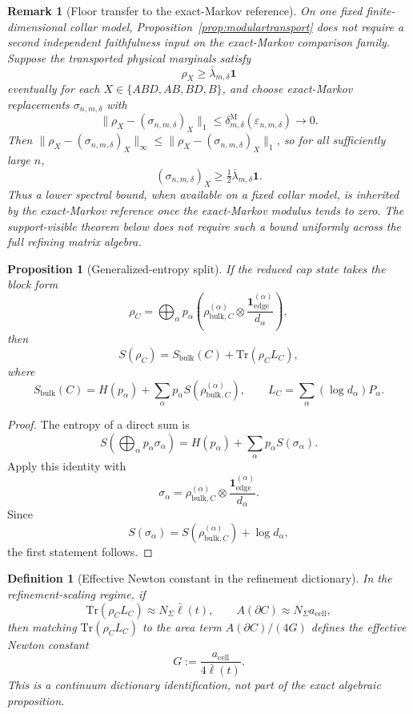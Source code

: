 \documentclass[11pt]{article}
\newtheorem{proposition}[theorem]{Proposition}
\newtheorem{definition}[theorem]{Definition}
\newtheorem{remark}[theorem]{Remark}
\begin{document}
\begin{remark}[Floor transfer to the exact-Markov reference]
On one fixed finite-dimensional collar model, Proposition~\ref{prop:modulartransport} does not require a second independent faithfulness input on the exact-Markov comparison family. Suppose the transported physical marginals satisfy
\[
\rho_X\ge \bar\lambda_{m,\delta}\mathbf 1
\]
eventually for each \(X\in\{ABD,AB,BD,B\}\), and choose exact-Markov replacements \(\sigma_{n,m,\delta}\) with
\[
\|\rho_X-(\sigma_{n,m,\delta})_X\|_1
\le
\delta^{\mathrm M}_{m,\delta}(\varepsilon_{n,m,\delta})
\longrightarrow 0.
\]
Then \(\|\rho_X-(\sigma_{n,m,\delta})_X\|_\infty\le \|\rho_X-(\sigma_{n,m,\delta})_X\|_1\), so for all sufficiently large \(n\),
\[
(\sigma_{n,m,\delta})_X
\ge
\tfrac12\bar\lambda_{m,\delta}\mathbf 1.
\]
Thus a lower spectral bound, when available on a fixed collar model, is inherited by the exact-Markov reference once the exact-Markov modulus tends to zero. The support-visible theorem below does not require such a bound uniformly across the full refining matrix algebra.
\end{remark}

\begin{proposition}[Generalized-entropy split]\label{prop:gensplit}
If the reduced cap state takes the block form
\[
\rho_C=
\bigoplus_\alpha p_\alpha
\left(
\rho^{(\alpha)}_{\mathrm{bulk},C}\otimes
\frac{\mathbf 1^{(\alpha)}_{\mathrm{edge}}}{d_\alpha}
\right),
\]
then
\[
S(\rho_C)=S_{\mathrm{bulk}}(C)+\mathrm{Tr}(\rho_C L_C),
\]
where
\[
S_{\mathrm{bulk}}(C)=H(p_\alpha)+\sum_\alpha p_\alpha S(\rho^{(\alpha)}_{\mathrm{bulk},C}),
\qquad
L_C=\sum_\alpha (\log d_\alpha)P_\alpha.
\]
\end{proposition}

\begin{proof}
The entropy of a direct sum is
\[
S\!\left(\bigoplus_\alpha p_\alpha \sigma_\alpha\right)
=
H(p_\alpha)+\sum_\alpha p_\alpha S(\sigma_\alpha).
\]
Apply this identity with
\[
\sigma_\alpha=
\rho^{(\alpha)}_{\mathrm{bulk},C}\otimes
\frac{\mathbf 1^{(\alpha)}_{\mathrm{edge}}}{d_\alpha}.
\]
Since
\[
S(\sigma_\alpha)=S(\rho^{(\alpha)}_{\mathrm{bulk},C})+\log d_\alpha,
\]
the first statement follows.
\end{proof}

\begin{definition}[Effective Newton constant in the refinement dictionary]\label{def:newton}
In the refinement-scaling regime, if
\[
\mathrm{Tr}(\rho_C L_C)\approx N_\Sigma \bar\ell(t),
\qquad
A(\partial C)\approx N_\Sigma a_{\mathrm{cell}},
\]
then matching $\mathrm{Tr}(\rho_C L_C)$ to the area term $A(\partial C)/(4G)$ defines the effective Newton constant
\[
G:=\frac{a_{\mathrm{cell}}}{4\bar\ell(t)}.
\]
This is a continuum dictionary identification, not part of the exact algebraic proposition.
\end{definition}
\end{document}
